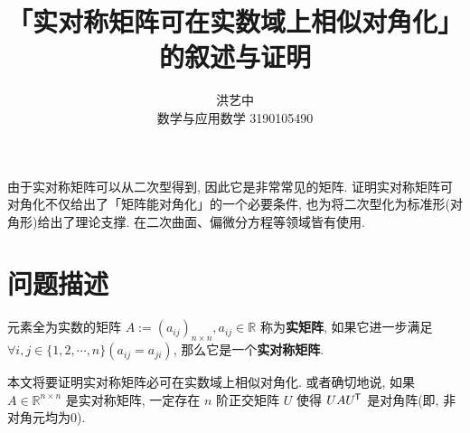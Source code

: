 \documentclass{ctexart}
\title{「实对称矩阵可在实数域上相似对角化」的叙述与证明}
\author{洪艺中 \\ 数学与应用数学 3190105490}
\newcommand*{\tran}{^{\mkern-1.5mu\mathsf{T}}}
\begin{document}
\maketitle



由于实对称矩阵可以从二次型得到, 因此它是非常常见的矩阵. 证明实对称矩阵可对角化不仅给出了「矩阵能对角化」的一个必要条件, 也为将二次型化为标准形(对角形)给出了理论支撑. 在二次曲面、偏微分方程等领域皆有使用. \par
\section{问题描述} %
\label{sec:问题描述}
元素全为实数的矩阵 $A := (a_{ij})_{n\times n}, a_{ij} \in \mathbb{R}$ 称为\textbf{实矩阵}, 如果它进一步满足 $\forall i, j \in \{1, 2, \cdots, n\}(a_{ij} = a_{ji})$, 那么它是一个\textbf{实对称矩阵}. \par
本文将要证明实对称矩阵必可在实数域上相似对角化. 或者确切地说, 如果 $A \in \mathbb{R}^{n \times n}$ 是实对称矩阵, 一定存在 $n$ 阶正交矩阵 $U$ 使得 $UAU\tran$ 是对角阵(即, 非对角元均为$0$). \par
\end{document}
